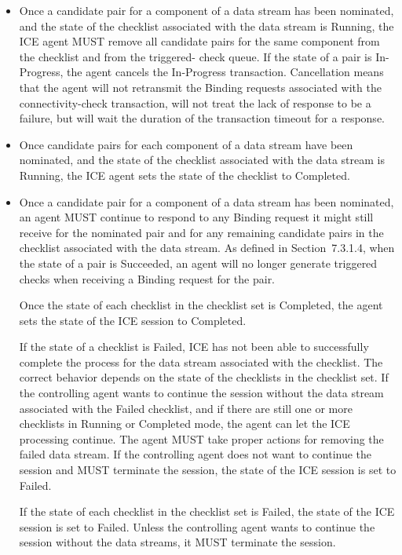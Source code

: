 \documentclass{article}
\begin{document}
\begin{itemize}
\item Once a candidate pair for a component of a data stream has been nominated, and the state of the checklist associated with the data stream is Running, the ICE agent MUST remove all candidate pairs for the same component from the checklist and from the triggered- check queue.  If the state of a pair is In-Progress, the agent cancels the In-Progress transaction.  Cancellation means that the agent will not retransmit the Binding requests associated with the connectivity-check transaction, will not treat the lack of response to be a failure, but will wait the duration of the transaction timeout for a response.
\item Once candidate pairs for each component of a data stream have been nominated, and the state of the checklist associated with the data stream is Running, the ICE agent sets the state of the checklist to Completed.
\item Once a candidate pair for a component of a data stream has been nominated, an agent MUST continue to respond to any Binding request it might still receive for the nominated pair and for any remaining candidate pairs in the checklist associated with the
data stream.  As defined in Section~7.3.1.4, when the state of a pair is Succeeded, an agent will no longer generate triggered checks when receiving a Binding request for the pair.

Once the state of each checklist in the checklist set is Completed, the agent sets the state of the ICE session to Completed.

If the state of a checklist is Failed, ICE has not been able to successfully complete the process for the data stream associated with the checklist.  The correct behavior depends on the state of the checklists in the checklist set.  If the controlling agent wants to continue the session without the data stream associated with the Failed checklist, and if there are still one or more checklists in Running or Completed mode, the agent can let the ICE processing continue.  The agent MUST take proper actions for removing the failed data stream.  If the controlling agent does not want to continue the session and MUST terminate the session, the state of the ICE session is set to Failed.

If the state of each checklist in the checklist set is Failed, the state of the ICE session is set to Failed.  Unless the controlling agent wants to continue the session without the data streams, it MUST terminate the session.

\end{itemize}
\end{document}
